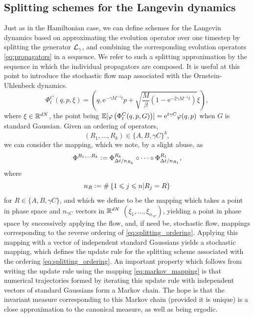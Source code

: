 \subsection{Splitting schemes for the Langevin dynamics}
Just as in the Hamiltonian case, we can define schemes for the Langevin dynamics based on approximating the evolution operator over one timestep by splitting the generator $\mathcal{L}_\gamma$, and combining the corresponding evolution operators \eqref{eq:propagators} in a sequence.
We refer to such a splitting approximation by the sequence in which the individual propagators are composed. It is useful at this point to introduce the stochastic flow map associated with the Ornstein-Uhlenbeck dynamics.
\begin{equation}
    \label{eq:stochastic_flow_c}
    \Phi_t^C(q,p,\xi)=\left(q, \mathrm e^{-\gamma M^{-1}t}p + \sqrt{\frac{M}{\beta}(1-\mathrm{e}^{-2\gamma M^{-1}t})}\xi\right),
\end{equation}
where $\xi\in \mathbb{R}^{dN}$, the point being $\mathbb{E}[\varphi\left(\Phi_t^C(q,p,G)\right)]=\mathrm{e}^{t\gamma C}\varphi(q,p)$ when $G$ is standard Gaussian.
Given an ordering of operators, 
\begin{equation}\label{eq:splitting_ordering}(R_1,\dots,R_k)\in \{A,B,\gamma C\}^k,\end{equation}
we can consider the mapping, which we note, by a slight abuse, as
\begin{equation}\label{eq:markov_mapping}\Phi^{R_1,\dots R_k}\mathrel{\mathop:}=\Phi_{\Delta t/n_{R_k}}^{R_k}\circ\dots\circ\Phi_{\Delta t/n_{R_1}}^{R_1},
\end{equation}
where
$$n_R\mathrel{\mathop:}= \#\left\{1\leqslant j\leqslant n \middle| R_j=R\right\}$$
for $R\in\{A,B,\gamma C\}$, and which we define to be the mapping which takes a point in phase space and $n_{\gamma C}$ vectors in $\mathbb{R}^{dN}$ $(\xi_1,\dots,\xi_{n_{\gamma C}})$, yielding a point in phase space by successively applying the flow, and, if need be, stochastic flow, mappings corresponding to the reverse ordering of \eqref{eq:splitting_ordering}.
Applying this mapping with a vector of independent standard Gaussians yields a stochastic mapping, which defines the update rule for the splitting scheme associated with the ordering \eqref{eq:splitting_ordering}.
An important property which follows from writing the update rule using the mapping \eqref{eq:markov_mapping} is that numerical trajectories formed by iterating this update rule with independent vectors of standard Gaussians form a Markov chain.
The hope is that the invariant measure corresponding to this Markov chain (provided it is unique) is a close approximation to the canonical measure, as well as being ergodic.

